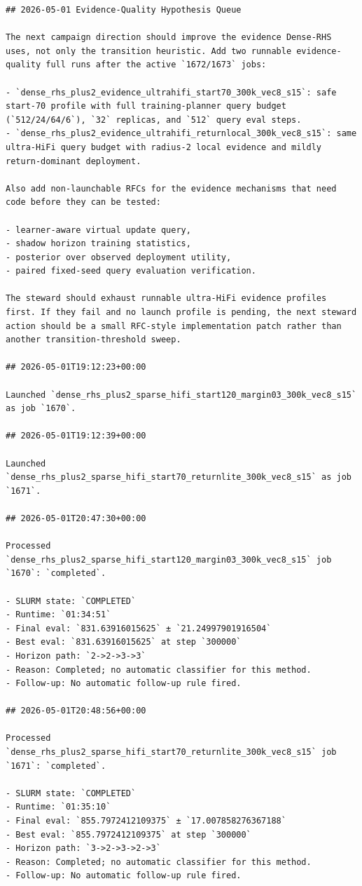 \begin{verbatim}
## 2026-05-01 Evidence-Quality Hypothesis Queue

The next campaign direction should improve the evidence Dense-RHS uses, not only the transition heuristic. Add two runnable evidence-quality full runs after the active `1672/1673` jobs:

- `dense_rhs_plus2_evidence_ultrahifi_start70_300k_vec8_s15`: safe start-70 profile with full training-planner query budget (`512/24/64/6`), `32` replicas, and `512` query eval steps.
- `dense_rhs_plus2_evidence_ultrahifi_returnlocal_300k_vec8_s15`: same ultra-HiFi query budget with radius-2 local evidence and mildly return-dominant deployment.

Also add non-launchable RFCs for the evidence mechanisms that need code before they can be tested:

- learner-aware virtual update query,
- shadow horizon training statistics,
- posterior over observed deployment utility,
- paired fixed-seed query evaluation verification.

The steward should exhaust runnable ultra-HiFi evidence profiles first. If they fail and no launch profile is pending, the next steward action should be a small RFC-style implementation patch rather than another transition-threshold sweep.

## 2026-05-01T19:12:23+00:00

Launched `dense_rhs_plus2_sparse_hifi_start120_margin03_300k_vec8_s15` as job `1670`.

## 2026-05-01T19:12:39+00:00

Launched `dense_rhs_plus2_sparse_hifi_start70_returnlite_300k_vec8_s15` as job `1671`.

## 2026-05-01T20:47:30+00:00

Processed `dense_rhs_plus2_sparse_hifi_start120_margin03_300k_vec8_s15` job `1670`: `completed`.

- SLURM state: `COMPLETED`
- Runtime: `01:34:51`
- Final eval: `831.63916015625` ± `21.24997901916504`
- Best eval: `831.63916015625` at step `300000`
- Horizon path: `2->2->3->3`
- Reason: Completed; no automatic classifier for this method.
- Follow-up: No automatic follow-up rule fired.

## 2026-05-01T20:48:56+00:00

Processed `dense_rhs_plus2_sparse_hifi_start70_returnlite_300k_vec8_s15` job `1671`: `completed`.

- SLURM state: `COMPLETED`
- Runtime: `01:35:10`
- Final eval: `855.7972412109375` ± `17.007858276367188`
- Best eval: `855.7972412109375` at step `300000`
- Horizon path: `3->2->3->2->3`
- Reason: Completed; no automatic classifier for this method.
- Follow-up: No automatic follow-up rule fired.


\end{verbatim}
